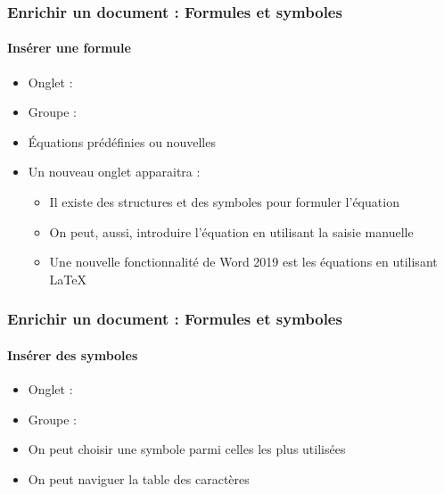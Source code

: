 \documentclass[xcolor=table]{beamer}
\begin{document}
\begin{frame}
\frametitle{Enrichir un document : Formules et symboles}
\framesubtitle{Insérer une formule}


\begin{minipage}{0.76\textwidth}
\begin{itemize}
	\item Onglet : 
	\item Groupe : 
	\item \'Equations prédéfinies ou nouvelles
	\item Un nouveau onglet apparaitra : 
	\begin{itemize}
		\item Il existe des structures et des symboles pour formuler l'équation 
		\item On peut, aussi, introduire l'équation en utilisant la saisie manuelle
		\item Une nouvelle fonctionnalité de Word 2019 est les équations en utilisant \LaTeX
	\end{itemize}
\end{itemize}
\end{minipage}
\begin{minipage}{0.23\textwidth}
		
\end{minipage}

\end{frame}

\begin{frame}
\frametitle{Enrichir un document : Formules et symboles}
\framesubtitle{Insérer des symboles}

\begin{minipage}{0.50\textwidth}
\begin{itemize}
	\item Onglet : 
	\item Groupe : 
	\item On peut choisir une symbole parmi celles les plus utilisées
	\item On peut naviguer la table des caractères
\end{itemize}
\end{minipage}
\begin{minipage}{0.49\textwidth}
	
\end{minipage}

\end{frame}
\end{document}

